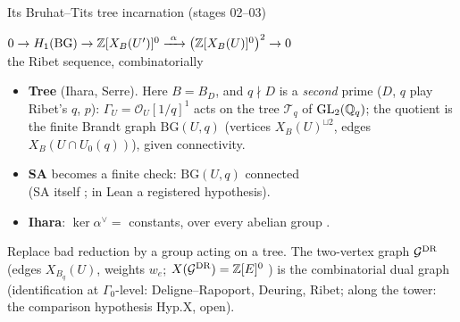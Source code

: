 \begin{frame}{Its Bruhat--Tits tree incarnation (stages 02--03)}
  \small
  \begin{center}
    \large $0\to H_1(\mathrm{BG})\to\ZZ[X_B(U')]^0\xrightarrow{\ \alpha\ }\big(\ZZ[X_B(U)]^0\big)^2\to0$\\[2pt]
    \normalsize the Ribet sequence, combinatorially 
  \end{center}
  \begin{itemize}\setlength{\itemsep}{1pt}
    \item \textbf{Tree} (Ihara, Serre). Here $B=B_D$, and $q\nmid D$ is a \emph{second} prime ($D$, $q$ play Ribet's $q$, $p$):
      $\Gamma_U=\mathcal O_U[1/q]^1$ acts on the tree $\mathcal T_q$ of $\mathrm{GL}_2(\mathbb{Q}_q)$;
      the quotient is the finite Brandt graph $\mathrm{BG}(U,q)$ (vertices $X_B(U)^{\sqcup2}$, edges $X_B(U\cap U_0(q))$), given connectivity.
    \item \textbf{SA} becomes a finite check: $\mathrm{BG}(U,q)$ connected\\
      (SA itself ; in Lean a registered hypothesis).
    \item \textbf{Ihara}: $\ker\alpha^\vee=$ constants, over every abelian group .
  \end{itemize}
  {\footnotesize Replace bad reduction by a group acting on a tree. The two-vertex graph $\mathcal G^{\mathrm{DR}}$ (edges $X_{B_q}(U)$, weights $w_e$; $X(\mathcal G^{\mathrm{DR}})=\mathbb{Z}[E]^0$
  ) is the combinatorial dual graph (identification at $\Gamma_0$-level: Deligne--Rapoport, Deuring, Ribet; along the tower: the comparison hypothesis Hyp.X, open).}
\end{frame}
